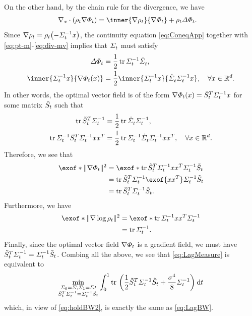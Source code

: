 On the other hand, by the chain rule for the divergence, we have
\begin{align}
\label{eq:div-mv}
\Div(\measure \vecsol)  &=   \inner{\nabla\measure}{\vecsol}  + \measure \Laplace\potsol.
\end{align}
Since $\nabla \measure = \measure \parens*{ -\Sigmasolinv\point }$, the continuity equation \eqref{eq:ConeqApp} together with \eqref{eq:pt-m}-\eqref{eq:div-mv} implies that $\Sigma^{}_{ t }$ must satisfy
\begin{align}
\Laplace\potsol &= \frac{1}{2} \tr \Sigmasolinv \dSigmasol, \\
\inner{\Sigmasolinv\point}{\vecsol(\point)}  &= \frac{1}{2} \inner{\Sigmasolinv\point}{\dSigmasol\Sigmasolinv\point}, \quad \forall \point \in \R^\vdim.
\end{align}
In other words, the optimal vector field is of the form $\nabla\Phi_{t}(x) = \tilde{S}_{t}^T \Sigma^{-1}_{ t }x$ for some matrix $\tilde{S}_{t}$ such that 
\begin{align}
\operatorname{tr}\tilde{S}_{t}^T  \Sigma^{-1}_{ t } &= \frac{1}{2}\operatorname{tr}\dot{\Sigma}^{}_{ t }\Sigma^{-1}_{ t }, \\
\operatorname{tr} \Sigma^{-1}_{ t } \tilde{S}_{t}^T \Sigma^{-1}_{ t } xx^T  &=\frac{1}{2} \operatorname{tr} \Sigma^{-1}_{ t } \dot{\Sigma}^{}_{ t } \Sigma^{-1}_{ t } xx^T , \quad \forall x\in\mathbb{R}^d.
\end{align}
Therefore, we see that
\begin{align}
\nn
\exof*{\norm{\vecsol}^2} &= \exof*{\tr \Ht^T \Sigmasolinv\point \point^T \Sigmasolinv \Ht} \\
\nn
&= \tr \Ht^T \Sigmasolinv \exof{\point\point^T } \Sigmasolinv \Ht \\
&= \tr \Ht^T \Sigmasolinv \Ht.
\end{align}
Furthermore, we have
\begin{align}
\nn
\exof*{ \norm{\nabla \log \measure}^2} &= \exof*{\tr \Sigmasolinv \point\point^T  \Sigmasolinv } \\
&= \tr \Sigmasolinv.
\end{align}
Finally, since the optimal vector field $\nabla\Phi_{t}$ is a gradient field, we must have $\tilde{S}_{t}^T  \Sigma^{-1}_{ t } = \Sigma^{-1}_{ t }\tilde{S}_{t}$. Combing all the above, we see that \eqref{eq:LagMeasure} is equivalent to
\begin{align}
\label{eq:LagMeasureEquiv}
\min_{\ssstyle\substack{{\Sigcurve[0] = \Sigma, \Sigcurve[\horizon] = \Sigma\prime} \\ { \Ht^T \Sigcurveinv =  \Sigcurveinv\Ht }}} \int_{0}^\horizon  \tr\ \parens*{\frac{1}{2}\Ht^T \Sigcurveinv \Ht  + \frac{\sdev^4}{8} \Sigcurveinv} \dt
\end{align}which, in view of \eqref{eq:holdBW2}, is exactly the same as \eqref{eq:LagBW}.


